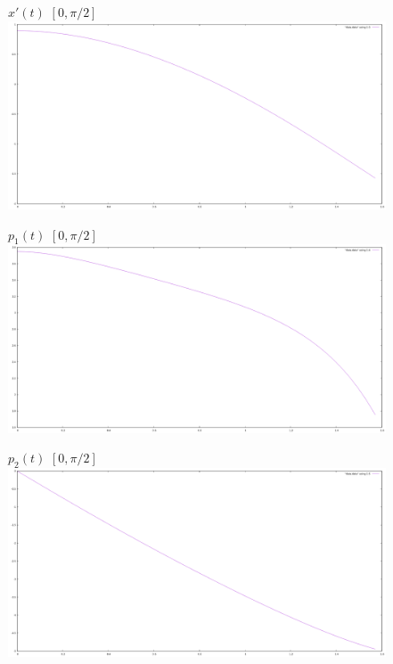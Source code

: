 \documentclass[titlepage]{article}
\begin{document}
\newpage
\begin{figure}[h!]
$x'(t)$ $[0, \pi/2]$\\
\centering
\includegraphics[width=1\linewidth]{x_21(t).png} 
\end{figure}
\begin{figure}[h!]
$p_1(t)$ $[0, \pi/2]$\\
\centering
\includegraphics[width=1\linewidth]{p_11(t).png} 
\end{figure}
\begin{figure}[h!]
$p_2(t)$ $[0, \pi/2]$\\
\centering
\includegraphics[width=1\linewidth]{p_21(t).png} 
\end{figure}
\end{document}
